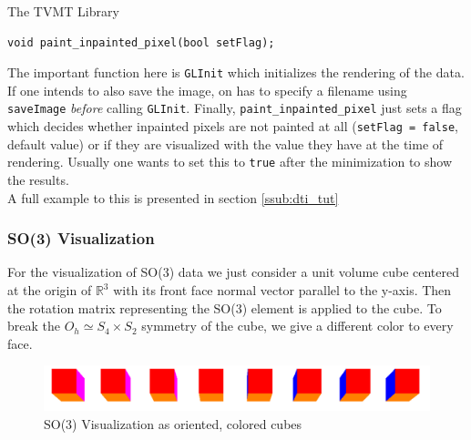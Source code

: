 \begin{chapter}{The TVMT Library}
\begin{lstlisting}
void paint_inpainted_pixel(bool setFlag);
\end{lstlisting}

The important function here is \texttt{GLInit} which initializes the rendering of the data. If one intends to also save the image, on has to specify a filename using
\texttt{saveImage} \textit{before} calling \texttt{GLInit}. Finally, \texttt{paint\_inpainted\_pixel} just sets a flag which decides whether inpainted pixels are not painted
at all (\texttt{setFlag = false}, default value) or if they are visualized with the value they have at the time of rendering. Usually one wants to set this to \texttt{true}
after the minimization to show the results.\\
A full example to this is presented in section \ref{ssub:dti_tut}\\

\subsubsection{SO(3) Visualization} %
\label{ssub:SO(3) Visualization}
For the visualization of SO(3) data we just consider a unit volume cube centered at the origin of $\mathbb{R}^3$ with its front face normal vector parallel to the y-axis.
Then the rotation matrix representing the SO(3) element is applied to the cube. To break the $O_h \simeq S_4\times S_2$ symmetry of the cube, we give a different color to
every face.

\begin{figure}[h!]
        \centering
	    \includegraphics[width=0.8\linewidth]{./figures/library/cubes.pdf}
	    \caption[SO(3) cube visualization]{SO(3) Visualization as oriented, colored cubes}
	\label{fig:cube_visualization}
\end{figure}


\end{chapter}
